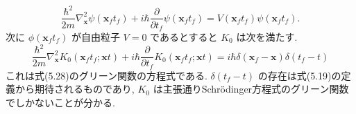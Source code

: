 \documentclass{jsarticle}
\begin{document}
\begin{equation*}
    \frac{\hbar^2}{2m}\nabla_{\mathbf{x}}^2 \psi(\mathbf{x}_f t_f) + i\hbar \frac{\partial}{\partial t_f} \psi(\mathbf{x}_f t_f) = V(\mathbf{x}_f t_f)\psi(\mathbf{x}_f t_f). \tag{5.28}
\end{equation*}
次に $\phi(\mathbf{x}_f t_f)$ が自由粒子 $V = 0$ であるとすると $K_0$ は次を満たす.
\begin{equation*}
    \frac{\hbar^2}{2m}\nabla_{\mathbf{x}}^2 K_0(\mathbf{x}_f t_f; \mathbf{x} t) + i\hbar \frac{\partial}{\partial t_f} K_0(\mathbf{x}_f t_f; \mathbf{x} t) = i\hbar \delta(\mathbf{x}_f - \mathbf{x})\delta(t_f - t) \tag{5.29}
\end{equation*}
これは式(5.28)のグリーン関数の方程式である. $\delta(t_f - t)$ の存在は式(5.19)の定義から期待されるものであり, $K_0$ は主張通りSchr\"{o}dinger方程式のグリーン関数でしかないことが分かる.
\color{blue}
\end{document}
